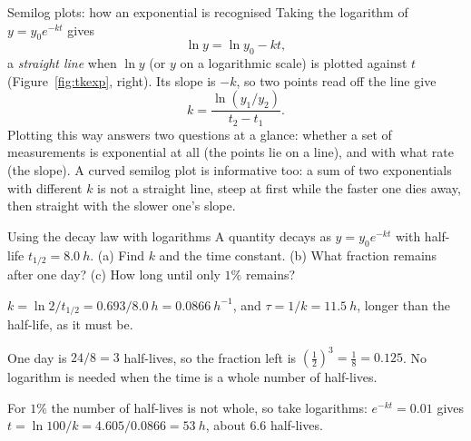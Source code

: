 \begin{figure}[htbp]
\centering
{}
\end{figure}

\begin{defbox}{Semilog plots: how an exponential is recognised}
Taking the logarithm of $y=y_0e^{-kt}$ gives
\[
\ln y=\ln y_0-kt,
\]
a \emph{straight line} when $\ln y$ (or $y$ on a logarithmic scale) is plotted against $t$
(Figure~\ref{fig:tkexp}, right). Its slope is $-k$, so two points read off the line give
\[
k=\frac{\ln(y_1/y_2)}{t_2-t_1}.
\]
Plotting this way answers two questions at a glance: whether a set of measurements is exponential at all
(the points lie on a line), and with what rate (the slope). A curved semilog plot is informative too: a
sum of two exponentials with different $k$ is not a straight line, steep at first while the faster one
dies away, then straight with the slower one's slope.
\end{defbox}

\begin{exbox}{Using the decay law with logarithms}
A quantity decays as $y=y_0e^{-kt}$ with half-life $t_{1/2}=\SI{8.0}{h}$. (a) Find $k$ and the time
constant. (b) What fraction remains after one day? (c) How long until only $1\%$ remains?

 $k=\ln2/t_{1/2}=0.693/\SI{8.0}{h}=\SI{0.0866}{h^{-1}}$, and $\tau=1/k=\SI{11.5}{h}$, longer than
the half-life, as it must be.

 One day is $24/8=3$ half-lives, so the fraction left is $(\tfrac12)^{3}=\tfrac18=0.125$. No
logarithm is needed when the time is a whole number of half-lives.

 For $1\%$ the number of half-lives is not whole, so take logarithms: $e^{-kt}=0.01$ gives
$t=\ln100/k=4.605/0.0866=\SI{53}{h}$, about $6.6$ half-lives.
\end{exbox}

